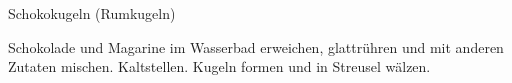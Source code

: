 \begin{recipe}[\vegetarian]{Schokokugeln (Rumkugeln)}

    \begin{ingredients}
    \end{ingredients}

    \begin{instructions}
        Schokolade und Magarine im Wasserbad erweichen, glattrühren und mit anderen Zutaten mischen.
        Kaltstellen.
        Kugeln formen und in Streusel wälzen.
    \end{instructions}
\end{recipe}
